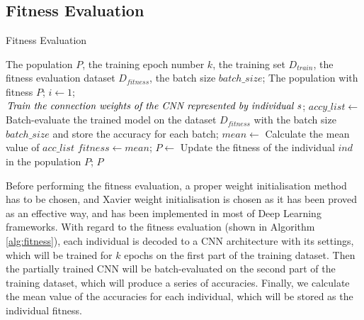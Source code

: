 \documentclass[conference]{IEEEtran}
\begin{document}
\subsection{Fitness Evaluation}
\begin{algorithm}
	\caption{Fitness Evaluation}
	\label{alg:fitness}
	\begin{algorithmic}
		\renewcommand{\algorithmicrequire}{\textbf{Input:}}
		\renewcommand{\algorithmicensure}{\textbf{Output:}}
		\REQUIRE The population $P$, the training epoch number $k$, the training set $D_{train}$, the fitness evaluation dataset $D_{fitness}$, the batch size $batch\_size$;
		\ENSURE The population with fitness $P$;
			\STATE $i \leftarrow 1$;
				\STATE $\textit{Train the connection weights of the CNN } \newline \textit{represented by individual s}$;
			\ENDWHILE
			\STATE $accy\_list \leftarrow$ Batch-evaluate the trained model on the dataset $D_{fitness}$ with the batch size $batch\_size$ and store the accuracy for each batch;
			\STATE $mean \leftarrow$ Calculate the mean value of  $acc\_list$
			\STATE $fitness \leftarrow mean$;
			\STATE $P \leftarrow$ Update the fitness of the individual $ind$ in the population $P$;
		\ENDFOR	
		\RETURN $P$	
	\end{algorithmic}
\end{algorithm}

Before performing the fitness evaluation, a proper weight initialisation method has to be chosen, and Xavier weight initialisation \cite{WeightIniti:Glorot} is chosen as it has been proved as an effective way, and has been implemented in most of Deep Learning frameworks. With regard to the fitness evaluation (shown in Algorithm \ref{alg:fitness}), each individual is decoded to a CNN architecture with its settings, which will be trained for $k$ epochs on the first part of the training dataset. Then the partially trained CNN will be batch-evaluated on the second part of the training dataset, which will produce a series of accuracies. Finally, we calculate the mean value of the accuracies for each individual, which will be stored as the individual fitness. 
\end{document}
